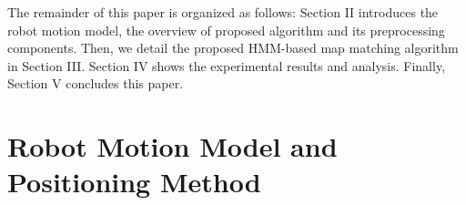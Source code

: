 \documentclass{llncs}
\begin{document}


The remainder of this paper is organized as follows: Section II introduces the robot motion model, the overview of proposed algorithm and its preprocessing components. Then, we detail the proposed HMM-based map matching algorithm in Section III. Section IV shows the experimental results and analysis. Finally, Section V concludes this paper.

\section{Robot Motion Model and Positioning Method}
\end{document}
